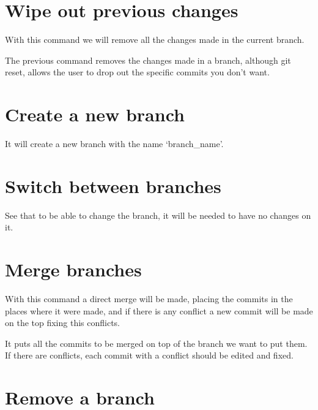 \section*{Wipe out previous changes}

\noindent{}

With this command we will remove all the changes made in the current branch.

\noindent{}

The previous command removes the changes made in a branch, although git reset, allows the user to drop out the specific commits you don't want.

\section*{Create a new branch}

\noindent{}

It will create a new branch with the name `branch\_name'.

\section*{Switch between branches}

\noindent{}

See that to be able to change the branch, it will be needed to have no changes on it.

\newpage
\section*{Merge branches}

\noindent{}

With this command a direct merge will be made, placing the commits in the places where it were made, and if there is any conflict a new commit will be made on the top fixing this conflicts.

\noindent{}

It puts all the commits to be merged on top of the branch we want to put them. If there are conflicts, each commit with a conflict should be edited and fixed.

\section*{Remove a branch}


